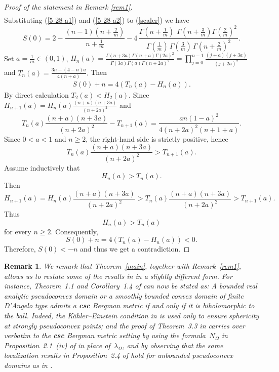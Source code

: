 \documentclass[a4paper,centertags,osxzneside,12pt]{amsart}
\newtheorem{remark}[theorem]{Remark}
\numberwithin{equation}{section}
\begin{document}
\begin{proof}[Proof of the statement in Remark \ref{rem1}]
\begin{equation}
\begin{split}
\end{split}
 \end{equation}   
Substituting (\ref{5-28-a1}) and (\ref{5-28-a2}) to (\ref{scaler}) we have
\begin{equation}
S(0)=2-\frac{(n-1)(n+\frac 2m)}{n+\frac 1m}
-4\,\frac{\Gamma\!\left(n+\frac1m\right)\,\
\Gamma\!\left(n+\frac3m\right)\Gamma\!\left(\frac2m\right)^2\,}{\Gamma\!\left(\frac1m\right)\,\Gamma\!\left(\frac3m\right)\,
\Gamma\!\left(n+\frac2m\right)^2}.
\end{equation}
Set $a=\frac{1}{m}\in(0, 1)$, $H_n(a)
=
\frac{
\Gamma(n+3a)\Gamma(n+a)\Gamma(2a)^2
}{
\Gamma(3a)\Gamma(a)\Gamma(n+2a)^2
}=\prod_{j=0}^{n-1}
\frac{(j+a)(j+3a)}{(j+2a)^2}$ and $T_n(a)
=\frac{3n+(4-n)a}{4(n+a)}.$ Then 
\begin{equation}
\begin{split}
    S(0)+n=4(T_n(a)-H_n(a)).
    \end{split}
\end{equation}
By direct calculation $T_2(a)<H_2(a)$.  Since
$H_{n+1}(a)=H_n(a)
\frac{(n+a)(n+3a)}{(n+2a)^2}$ and 
$$
T_n(a)\frac{(n+a)(n+3a)}{(n+2a)^2}-T_{n+1}(a)=\frac{an(1-a)^2}{4(n+2a)^2(n+1+a)}.
$$
Since $0<a<1$ and $n\geq 2$, the right-hand side is strictly positive,
hence
\[T_n(a)\frac{(n+a)(n+3a)}{(n+2a)^2}>T_{n+1}(a).
\]
Assume inductively that
\[H_n(a)>T_n(a).\]
Then
\[H_{n+1}(a)=H_n(a)\frac{(n+a)(n+3a)}{(n+2a)^2}>T_n(a)\frac{(n+a)(n+3a)}{(n+2a)^2}>T_{n+1}(a).\]
Thus
\[H_n(a)>T_n(a)\]
for every $n\ge2$.
Consequently,
\[S(0)+n=4(T_n(a)-H_n(a))<0.\]
Therefore, $S(0)<-n$ and thus we get a contradiction.
\end{proof}

\begin{remark}
We remark that Theorem~\ref{main}, together with Remark~\ref{rem1},
allows us to restate some of the results in \cite{HHL26} 
in a slightly different form. For instance,
Theorem~1.1 and Corollary~1.4 of \cite{HHL26} can now be stated as:  A bounded real analytic pseudoconvex domain  
or
a smoothly bounded  convex domain of finite D'Angelo type   
admits a {\bf csc} Bergman metric if and only if it is biholomorphic to the ball.
Indeed, the K\"ahler--Einstein condition in \cite{HHL26} is used
only to ensure sphericity at strongly pseudoconvex points; 
and the proof of Theorem~3.3 in \cite{HHL26} carries over verbatim to the
{\bf csc} Bergman metric setting by using the formula~$N_\Omega$ in Proposition~2.1~(iv) of \cite{KYu96} in place of~$\lambda_\Omega$, and by observing that the same localization 
results in Proposition~2.4 of \cite{KYu96} hold  for unbounded pseudoconvex domains as in \cite{HJL25}.
\end{remark}
\end{document}
